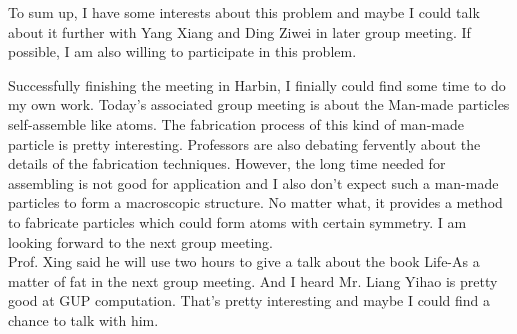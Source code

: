 \documentclass[fontsize=11pt, %
                             paper=a4, %
                             twoside, %
                             captions=tableheading,
                             index=totoc,
                             hyperref]{labbook}
\begin{document}
\begin{addmargin}[4cm]{0cm}
To sum up, I have some interests about this problem and maybe I could talk about it further with Yang Xiang and Ding Ziwei in later group meeting. If possible, I am also willing to participate in this problem.

Successfully finishing the meeting in Harbin, I finially could find some time to do my own work. Today's associated group meeting is about the Man-made particles self-assemble like atoms. The fabrication process of this kind of man-made particle is pretty interesting. Professors are also debating fervently about the details of the fabrication techniques. However, the long time needed for assembling is not good for application and I also don't expect such a man-made particles to form a macroscopic structure. No matter what, it provides a method to fabricate particles which could form atoms with certain symmetry. I am looking forward to the next group meeting. \\
Prof. Xing said he will use two hours to give a talk about the book Life-As a matter of fat in the next group meeting. And I heard Mr. Liang Yihao is pretty good at GUP computation. That's pretty interesting and maybe I could find a chance to talk with him. 
\end{addmargin}





\end{document}
